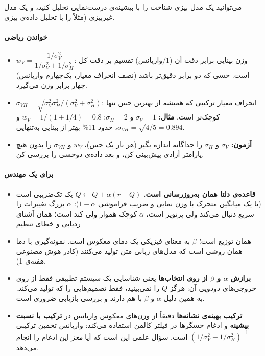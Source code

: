 می‌توانید یک مدل بیزی شناخت را با بیشینه‌ی درست‌نمایی تحلیل کنید، و یک مدل
غیربیزی (مثلاً  را با تحلیل داده‌ی بیزی.

\paragraph{خواندن ریاضی}

\begin{itemize}
\tightlist
\item
  \(w_V = \dfrac{1/\sigma_V^2}{1/\sigma_V^2 + 1/\sigma_H^2}\): وزن
  بینایی برابر دقت آن (1/واریانس) تقسیم بر دقت کل است. حسی که دو برابر
  دقیق‌تر باشد (نصف انحراف معیار، یک‌چهارم واریانس) چهار برابر وزن می‌گیرد.
\item
  \(\sigma_{VH} = \sqrt{\sigma_V^2\sigma_H^2/(\sigma_V^2 + \sigma_H^2)}\):
  انحراف معیار ترکیبی که همیشه از بهترین حس تنها کوچک‌تر است.
  \textbf{مثال:} \(\sigma_V = 1\) و \(\sigma_H = 2\):
  \(w_V = 1/(1 + 1/4) = 0.8\) و \(\sigma_{VH} = \sqrt{4/5} = 0.894\)،
  حدود 11\% بهتر از بینایی به‌تنهایی.
\item
  \textbf{آزمون:} \(\sigma_V\) و \(\sigma_H\) را جداگانه اندازه بگیر (هر
  بار یک حس)، \(w_V\) و \(\sigma_{VH}\) را بدون هیچ پارامتر آزادی
  پیش‌بینی کن، و بعد داده‌ی دوحسی را بررسی کن.
\end{itemize}

\paragraph{برای یک مهندس}

\begin{itemize}
\tightlist
\item
  \textbf{قاعده‌ی دلتا همان به‌روزرسانی  است.}
  \(Q \leftarrow Q + \alpha(r - Q)\) یک  تک‌ضریبی است (یا یک
  میانگین متحرک با وزن نمایی و ضریب فراموشی \(1-\alpha\)): \(\alpha\)
  بزرگ تغییرات را سریع دنبال می‌کند ولی پرنویز است، \(\alpha\) کوچک هموار
  ولی کند است؛ همان  آشنای ردیابی و خطای تنظیم
\item
  \textbf{} همان توزیع  است؛ \(\beta\)
  به معنای فیزیکی یک دمای معکوس است. نمونه‌گیری با دما همان روشی است که
  مدل‌های زبانی متن تولید می‌کنند (کادر هوش مصنوعی هفته‌ی 1).
\item
  \textbf{برازش \(\alpha\) و \(\beta\) از روی انتخاب‌ها} یعنی شناسایی یک
  سیستم تطبیقی فقط از روی خروجی‌های دودویی آن: هرگز \(Q\) را نمی‌بینید،
  فقط تصمیم‌هایی را که تولید می‌کند. به همین دلیل \(\alpha\) و \(\beta\)
  با هم  دارند و بررسی بازیابی ضروری است.
\item
  \textbf{ترکیب بهینه‌ی نشانه‌ها} دقیقاً از وزن‌های معکوس واریانس در
  \textbf{ترکیب با نسبت بیشینه } و ادغام حسگرها در فیلتر کالمن
  استفاده می‌کند: واریانس تخمین ترکیبی
  \((1/\sigma_V^2 + 1/\sigma_H^2)^{-1}\) است. سؤال علمی این است که آیا
  \emph{مغز} این ادغام را انجام می‌دهد.
\end{itemize}

